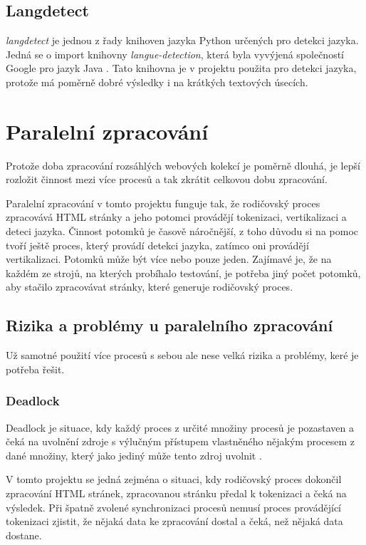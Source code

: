 \subsection{Langdetect}
\label{langdetect}
\textit{langdetect} je jednou z řady knihoven jazyka Python určených pro detekci jazyka.
Jedná se o import knihovny \textit{langue-detection}, která byla vyvýjená společností Google
pro jazyk Java \cite{LANGDETECT}. Tato knihovna je v projektu použita pro detekci jazyka,
protože má poměrně dobré výsledky i na krátkých textových úsecích.

\section{Paralelní zpracování}
\label{paralel_tokenizer}
Protože doba zpracování rozsáhlých webových kolekcí je poměrně dlouhá, je lepší rozložit
činnost mezi více procesů a tak zkrátit celkovou dobu zpracování.

Paralelní zpracování v tomto projektu funguje tak, že rodičovský proces zpracovává HTML
stránky a jeho potomci provádějí tokenizaci, vertikalizaci a deteci jazyka.
Činnost potomků je časově náročnější, z toho důvodu si na pomoc tvoří ještě proces,
který provádí detekci jazyka, zatímco oni provádějí vertikalizaci.
Potomků může být více nebo pouze jeden. Zajímavé je, že na každém ze strojů, na kterých
probíhalo testování, je potřeba jiný počet potomků, aby stačilo zpracovávat stránky, které
generuje rodičovský proces.

\subsection{Rizika a problémy u paralelního zpracování}
Už samotné použití více procesů s sebou ale nese velká rizika a problémy, keré je potřeba řešit.

\subsubsection{Deadlock}
\label{deadlock}
Deadlock je situace, kdy každý proces z určité množiny procesů je pozastaven a čeká na
uvolnění zdroje s výlučným přístupem vlastněného nějakým procesem z dané množiny, který
jako jediný může tento zdroj uvolnit \cite{SYNCPROCES}.

V tomto projektu se jedná zejména o situaci, kdy rodičovský proces dokončil zpracování HTML stránek,
zpracovanou stránku předal k tokenizaci a čeká na výsledek. Při špatně zvolené synchronizaci
procesů nemusí proces provádějící tokenizaci zjistit, že nějaká data ke zpracování dostal
a čeká, než nějaká data dostane.


